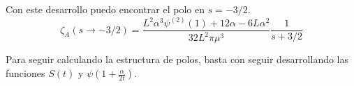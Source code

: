 Con este desarrollo puedo encontrar el polo en $s=-3/2$.
\begin{equation}
\zeta _A (s \rightarrow -3/2) = 
\frac{L ^2 \alpha  ^3 \psi ^{(2)} (1) + 12   \alpha  - 6 L \alpha ^2}{32 L^2 \pi \mu ^3}
\frac{1}{s+3/2}
\end{equation}

Para seguir calculando la estructura de polos, basta con seguir desarrollando las funciones $S(t)$ y $\psi (1 + \frac{\alpha}{2 t})$.

\begin{comment}
Las primeras 3 integrales se pueden realizar analíticamente de manera sencilla, dado que son todas series de potencias, la integral angular va a tener que ser evaluada numéricamente dado que es de la forma (parametrizando $\lambda = e ^{i \theta}$ y llamando $M_c$ a todo el termino adentro del Lnaritmo) :

\begin{equation}
\begin{array}{c}

\frac{1}{2 \pi i} \int _{\pi /2 } ^{- \pi /2} 
\frac{e ^{-2 s i \theta} d \theta}{M [e ^{i \theta}]} \\

\Bigg[

\frac{
e ^{- \frac{i \alpha (Ln[2 L] + i \theta)}{2 e ^{i \theta} }} e ^{2 i L e ^{i \theta}}
}{\Gamma \left( 1 - \frac{i \alpha}{2 e ^{i \theta}} \right)}
	\left(
		\left(
			2 i L -
			\frac{i \alpha}{2 e ^{2 i \theta} } + 
			\frac{i \alpha( Ln[2 L ] + e ^{i \theta} ) }{2 e^{2 i \theta}}
			- \frac{i \alpha \psi \left( 1 - \frac{i \alpha}{2 e ^{i \theta}}\right)}
				   {2 e ^{2 i \theta}}
			\right) S1 [e ^{i \theta}] +
		S1 ' [e ^{i \theta }]
		\right)
  \\

- \frac{
e ^{ \frac{i \alpha (Ln[2 L] + i \theta)}{2 e ^{i \theta} }}
}{\Gamma \left( 1 + \frac{i \alpha}{2 e ^{i \theta}} \right)}
	\left(
		\left(
			\frac{i \alpha}{2 e ^{2 i \theta} } - 
			\frac{i \alpha( Ln[2 L ] + e ^{i \theta} ) }{2 e^{2 i \theta}}
			+ \frac{i \alpha \psi \left( 1 + \frac{i \alpha}{2 e ^{i \theta}}\right)}
				   {2 e ^{2 i \theta}}
			\right) S2 [e ^{i \theta}] +
		S'2 [e ^{i \theta }]
		\right)


\Bigg]

\end{array}
\end{equation}

La cual va a dar una constante independiente de $\lambda$ y se puede calcular numéricamente.



\end{comment}
